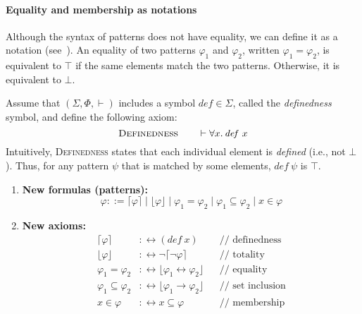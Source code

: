 \documentclass{article}
\theoremstyle{plain}
\theoremstyle{definition}
\newcommand{\ld}{\mathord{.\,}}
\newcommand{\imp}{\to}
\newcommand{\dimp}{\leftrightarrow}
\newcommand{\eqbynot}{\mathbin{{:}{\leftrightarrow}}}
\newcommand{\ceil}[1]{\lceil #1 \rceil}
\newcommand{\floor}[1]{\lfloor #1 \rfloor}
\begin{document}
\paragraph{Equality and membership as notations\\}
Although the syntax of patterns does not have equality, 
we can define it as a notation (see~\cite{CLR21a}).
An equality of two patterns $\varphi_1$ and $\varphi_2$, 
written $\varphi_1 = \varphi_2$,
is equivalent to $\top$ if the same elements match the
two patterns.
Otherwise, it is equivalent to $\bot$. 

Assume that $(\Sigma, \Phi, \vdash)$ includes a symbol $\mathit{def} \in \Sigma$, called the \emph{definedness} symbol,
and define the following axiom:
\[
\textsc{Definedness}\qquad \vdash\forall x \ld \mathit{def}\ x
\]
Intuitively, \textsc{Definedness} states that each individual element is \emph{defined} (i.e., not $\bot$). 
Thus, for any pattern $\psi$ that is matched by 
some elements, $\mathit{def}\ \psi$ is $\top$.  
\begin{enumerate}
\item \textbf{New formulas (patterns): }
\[
\varphi ::=  \ceil{\varphi} \mid \floor{\varphi} \mid \varphi_1 = \varphi_2 \mid \varphi_1 \subseteq \varphi_2 \mid x \in \varphi
\]
\item \textbf{New axioms:}
\begin{align*}
\ceil{\varphi} & \eqbynot (\mathit{def}\ x)
&& \textrm{// definedness}\\
\floor{\varphi} & \eqbynot \neg \ceil{\neg \varphi}
&& \textrm{// totality}\\
\varphi_1 = \varphi_2 & \eqbynot \floor{\varphi_1 \dimp \varphi_2}
&& \textrm{// equality}\\
\varphi_1 \subseteq \varphi_2 & \eqbynot \floor{\varphi_1 \imp \varphi_2}
&& \textrm{// set inclusion}\\
x \in \varphi & \eqbynot x \subseteq \varphi
&& \textrm{// membership}
\end{align*}
\end{enumerate}
\end{document}
